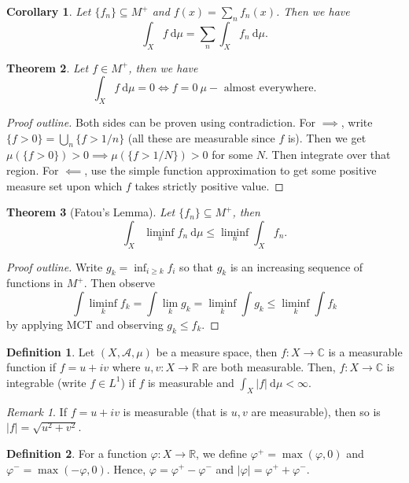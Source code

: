 \documentclass[letterpaper,12pt]{article}
\theoremstyle{definition}
\newtheorem{definition}{Definition}[section]
\theoremstyle{plain}
\newtheorem{thm}{Theorem}[section]
\newtheorem{corollary}[thm]{Corollary}
\theoremstyle{remark}
\newtheorem*{remark}{Remark}
\newcommand{\R}{\mathbb{R}}
\newcommand{\C}{\mathbb{C}}
\begin{document}
\begin{corollary}
Let $\{f_n\}\subseteq M^+$ and $f(x) = \sum_n f_n(x)$. Then we have
\[\int_X f\ \mathrm{d}\mu = \sum_n\int_X f_n\ \mathrm{d}\mu.\]
\end{corollary}

\begin{thm}
Let $f\in M^+$, then we have
\[\int_X f\ \mathrm{d}\mu=0\iff f=0\ \mu-\text{ almost everywhere}.\]
\end{thm}

\begin{proof}[Proof outline]
Both sides can be proven using contradiction. For $\implies$, write $\{f>0\} = \bigcup_n \{f>1/n\}$ (all these are measurable since $f$ is). Then we get $\mu(\{f>0\})>0\implies \mu(\{f>1/N\})>0$ for some $N$. Then integrate over that region. For $\impliedby$, use the simple function approximation to get some positive measure set upon which $f$ takes strictly positive value.
\end{proof}

\begin{thm}[Fatou's Lemma]
Let $\{f_n\}\subseteq M^+$, then
\[\int_X \liminf_n f_n\ \mathrm{d}\mu \leq \liminf_n \int_X f_n.\]
\end{thm}

\begin{proof}[Proof outline]
Write $g_k = \inf_{i\geq k}f_i$ so that $g_k$ is an increasing sequence of functions in $M^+$. Then observe
\[\int \liminf_k f_k = \int \lim_kg_k = \liminf_k\int g_k \leq \liminf_k \int f_k\]
by applying MCT and observing $g_k\leq f_k$.
\end{proof}

\begin{definition}
Let $(X,\mathcal{A},\mu)$ be a measure space, then $f:X\to \C$ is a measurable function if $f=u+iv$ where $u,v:X\to\R$ are both measurable. Then, $f:X\to\C$ is integrable (write $f\in L^1$) if $f$ is measurable and $\int_X |f|\ \mathrm{d}\mu<\infty$.
\end{definition}

\begin{remark}
If $f=u+iv$ is measurable (that is $u,v$ are measurable), then so is $|f| = \sqrt{u^2+v^2}$.
\end{remark}

\begin{definition}
For a function $\varphi:X\to\R$, we define $\varphi^+ = \max(\varphi,0)$ and $\varphi^- = \max(-\varphi,0)$. Hence, $\varphi= \varphi^+-\varphi^-$ and $|\varphi| = \varphi^++\varphi^-$.
\end{definition}
\end{document}
